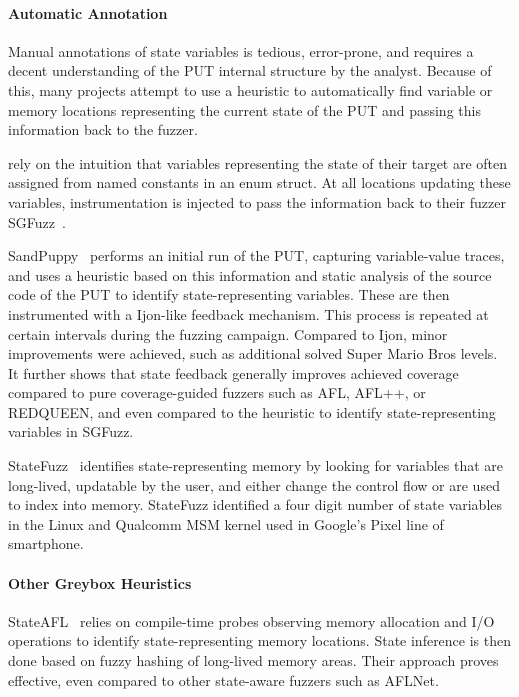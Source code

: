 \documentclass[twocolumn]{article}
\let\savedCite=\cite
\renewcommand{\cite}{\unskip~\savedCite}
\begin{document}
\paragraph{Automatic Annotation}

Manual annotations of state variables is tedious, error-prone, and requires a decent understanding of the PUT internal structure by the analyst. Because of this, many projects attempt to use a heuristic to automatically find variable or memory locations representing the current state of the PUT and passing this information back to the fuzzer.

\citeauthor{SGFuzz} rely on the intuition that variables representing the state of their target are often assigned from named constants in an enum struct. At all locations updating these variables, instrumentation is injected to pass the information back to their fuzzer SGFuzz\cite{SGFuzz}.

SandPuppy\cite{SandPuppy} performs an initial run of the PUT, capturing variable-value traces, and uses a heuristic based on this information and static analysis of the source code of the PUT to identify state-representing variables. These are then instrumented with a Ijon-like feedback mechanism. This process is repeated at certain intervals during the fuzzing campaign. Compared to Ijon, minor improvements were achieved, such as additional solved Super Mario Bros levels. It further shows that state feedback generally improves achieved coverage compared to pure coverage-guided fuzzers such as AFL, AFL++, or REDQUEEN, and even compared to the heuristic to identify state-representing variables in SGFuzz.

StateFuzz\cite{StateFuzz} identifies state-representing memory by looking for variables that are long-lived, updatable by the user, and either change the control flow or are used to index into memory. StateFuzz identified a four digit number of state variables in the Linux and Qualcomm MSM kernel used in Google's Pixel line of smartphone.

\paragraph{Other Greybox Heuristics}

StateAFL\cite{StateAFL} relies on compile-time probes observing memory allocation and I/O operations to identify state-representing memory locations. State inference is then done based on fuzzy hashing of long-lived memory areas. Their approach proves effective, even compared to other state-aware fuzzers such as AFLNet.
\end{document}
